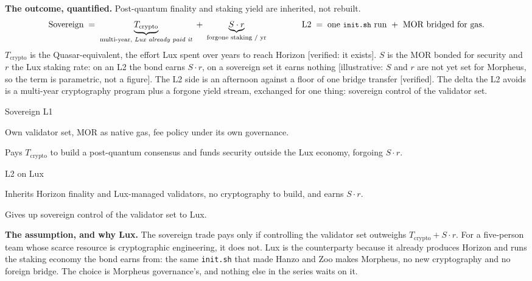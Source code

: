 \documentclass[11pt,a4paper]{article}
\newcommand{\code}[1]{\texttt{\small #1}}
\begin{document}
\vspace{0.4ex}
\noindent\textbf{The outcome, quantified.}
Post-quantum finality and staking yield are inherited, not rebuilt.
\[
\text{Sovereign} \;=\; \underbrace{T_{\mathrm{crypto}}}_{\text{multi-year, \emph{Lux already paid it}}}
\;+\; \underbrace{S\cdot r}_{\text{forgone staking / yr}}
\qquad\qquad
\text{L2} \;=\; \text{one \code{init.sh} run } + \text{ MOR bridged for gas.}
\]
$T_{\mathrm{crypto}}$ is the Quasar-equivalent, the effort Lux spent over years to reach Horizon
[verified: it exists]. $S$ is the MOR bonded for security and $r$ the Lux staking rate: on an L2 the
bond earns $S\cdot r$, on a sovereign set it earns nothing [illustrative: $S$ and $r$ are not yet set
for Morpheus, so the term is parametric, not a figure]. The L2 side is an afternoon against a floor of
one bridge transfer [verified]. The delta the L2 avoids is a multi-year cryptography program plus a
forgone yield stream, exchanged for one thing: sovereign control of the validator set.

\begin{stake}{Sovereign L1}
\item Own validator set, MOR as native gas, fee policy under its own governance.
\item Pays $T_{\mathrm{crypto}}$ to build a post-quantum consensus and funds security outside the Lux economy, forgoing $S\cdot r$.
\end{stake}
\begin{stake}{L2 on Lux}
\item Inherits Horizon finality and Lux-managed validators, no cryptography to build, and earns $S\cdot r$.
\item Gives up sovereign control of the validator set to Lux.
\end{stake}

\noindent\textbf{The assumption, and why Lux.}
The sovereign trade pays only if controlling the validator set outweighs $T_{\mathrm{crypto}} + S\cdot
r$. For a five-person team whose scarce resource is cryptographic engineering, it does not. Lux is the
counterparty because it already produces Horizon and runs the staking economy the bond earns from: the
same \code{init.sh} that made Hanzo and Zoo makes Morpheus, no new cryptography and no foreign bridge.
The choice is Morpheus governance's, and nothing else in the series waits on it.

\vspace{0.5ex}
\end{document}
